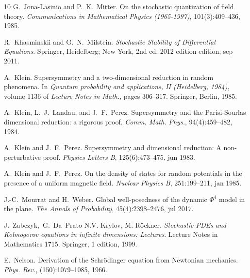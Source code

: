 \documentclass[a4paper,10pt]{article}
\newcommand{\tmtextit}[1]{{\itshape{#1}}}
\begin{document}
\begin{thebibliography}{10}
  G.~Jona-Lasinio  and 
  P.~K.~Mitter. {\newblock}On the stochastic quantization of field theory.
  {\newblock}\tmtextit{Communications in Mathematical Physics (1965-1997)},
  101(3):409--436, 1985.{\newblock}
  
  R.~Khasminskii  and 
  G.~N.~Milstein. {\newblock}\tmtextit{Stochastic Stability of Differential
  Equations}. {\newblock}Springer, Heidelberg; New York, 2nd ed. 2012 edition 
  edition, sep 2011.{\newblock}
  
  A.~Klein. {\newblock}Supersymmetry and
  a two-dimensional reduction in random phenomena. {\newblock}In
  \tmtextit{Quantum probability and applications, II (Heidelberg, 1984)}, 
  volume  1136  of \tmtextit{Lecture Notes in Math.},  pages  306--317.
  Springer, Berlin, 1985.{\newblock}
  
  A.~Klein, L.~J.~Landau, and  J.~F.~Perez.
  {\newblock}Supersymmetry and the Parisi-Sourlas dimensional reduction: a
  rigorous proof. {\newblock}\tmtextit{Comm. Math. Phys.}, 94(4):459--482,
  1984.{\newblock}
  
  A.~Klein  and  J.~F.~Perez.
  {\newblock}Supersymmetry and dimensional reduction: A non-perturbative
  proof. {\newblock}\tmtextit{Physics Letters B}, 125(6):473--475, jun
  1983.{\newblock}
  
  A.~Klein  and  J.~F.~Perez. {\newblock}On
  the density of states for random potentials in the presence of a uniform
  magnetic field. {\newblock}\tmtextit{Nuclear Physics B}, 251:199--211, jan
  1985.{\newblock}
  
  J.-C.~Mourrat  and  H.~Weber. {\newblock}Global
  well-posedness of the dynamic $\Phi^4$ model in the plane.
  {\newblock}\tmtextit{The Annals of Probability}, 45(4):2398--2476, jul
  2017.{\newblock}
  
  J.~Zabczyk,~G.~Da~Prato N.V. Krylov, M.
  R{\"o}ckner. {\newblock}\tmtextit{Stochastic PDEs and Kolmogorov equations
  in infinite dimensions: Lectures}. {\newblock}Lecture Notes in Mathematics
  1715. Springer, 1  edition, 1999.{\newblock}
  
  E.~Nelson. {\newblock}Derivation of the
  Schr{\"o}dinger equation from Newtonian mechanics.
  {\newblock}\tmtextit{Phys. Rev.}, (150):1079--1085, 1966.{\newblock}
  

\end{thebibliography}
\end{document}
